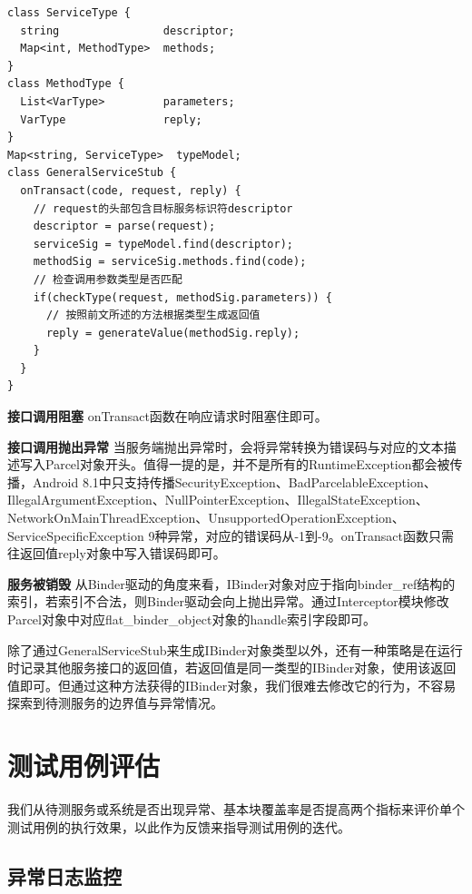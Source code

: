 \documentclass[winfonts,master,twoside]{njuthesis}
\begin{document}
\begin{lstlisting}[caption={GeneralServiceStub实现逻辑伪代码},label={lst:generalservicestub_impl}]
class ServiceType {
  string                descriptor;
  Map<int, MethodType>  methods;
}
class MethodType {
  List<VarType>         parameters;
  VarType               reply;
}
Map<string, ServiceType>  typeModel;
class GeneralServiceStub {
  onTransact(code, request, reply) {
    // request的头部包含目标服务标识符descriptor
    descriptor = parse(request);
    serviceSig = typeModel.find(descriptor);
    methodSig = serviceSig.methods.find(code);
    // 检查调用参数类型是否匹配
    if(checkType(request, methodSig.parameters)) {
      // 按照前文所述的方法根据类型生成返回值
      reply = generateValue(methodSig.reply);
    }
  }
}
\end{lstlisting}

\textbf{接口调用阻塞} \quad onTransact函数在响应请求时阻塞住即可。

\textbf{接口调用抛出异常} \quad 当服务端抛出异常时，会将异常转换为错误码与对应的文本描述写入Parcel对象开头。值得一提的是，并不是所有的RuntimeException都会被传播，Android 8.1中只支持传播SecurityException、BadParcelableException、IllegalArgumentException、NullPointerException、IllegalStateException、NetworkOnMainThreadException、UnsupportedOperationException、ServiceSpecificException 9种异常，对应的错误码从-1到-9。onTransact函数只需往返回值reply对象中写入错误码即可。

\textbf{服务被销毁} \quad 从Binder驱动的角度来看，IBinder对象对应于指向binder\_ref结构的索引，若索引不合法，则Binder驱动会向上抛出异常。通过Interceptor模块修改Parcel对象中对应flat\_binder\_object对象的handle索引字段即可。

除了通过GeneralServiceStub来生成IBinder对象类型以外，还有一种策略是在运行时记录其他服务接口的返回值，若返回值是同一类型的IBinder对象，使用该返回值即可。但通过这种方法获得的IBinder对象，我们很难去修改它的行为，不容易探索到待测服务的边界值与异常情况。

\section{测试用例评估}

我们从待测服务或系统是否出现异常、基本块覆盖率是否提高两个指标来评价单个测试用例的执行效果，以此作为反馈来指导测试用例的迭代。

\subsection{异常日志监控}
\end{document}

